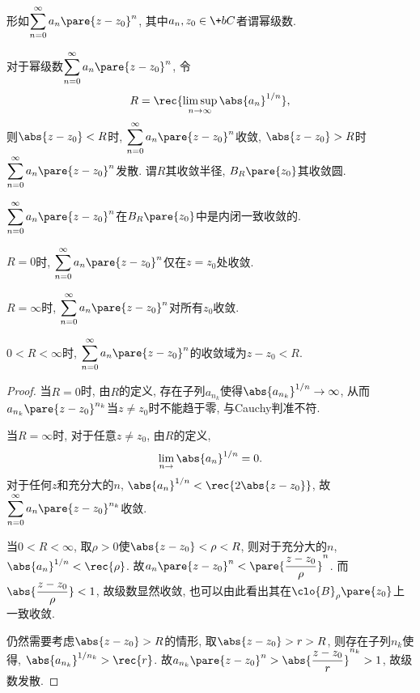 \documentclass{ctexart}
\begin{document}
\begin{definition}[幂级数]
    形如$\displaystyle \sum_{n=0}^\infty a_n\pare{z-z_0}^n$, 其中$a_n,z_0\in \+bC$者谓幂级数.
\end{definition}
\begin{theorem}[Abel判准]
    对于幂级数$\displaystyle \sum_{n=0}^\infty a_n\pare{z-z_0}^n$, 令
    \[ R = \rec{\limsup \limits_{n\rightarrow \infty} \abs{a_n}^{1/n}}, \]
    则$\abs{z-z_0}<R$时, $\displaystyle \sum_{n=0}^\infty a_n\pare{z-z_0}^n$收敛, $\abs{z-z_0}>R$时$\displaystyle \sum_{n=0}^\infty a_n\pare{z-z_0}^n$发散. 谓$R$其收敛半径, $B_R\pare{z_0}$其收敛圆.
\end{theorem}
\begin{remark}
    $\displaystyle \sum_{n=0}^\infty a_n\pare{z-z_0}^n$在$B_R\pare{z_0}$中是内闭一致收敛的.
\end{remark}
\begin{remark}
    $R=0$时, $\displaystyle \sum_{n=0}^\infty a_n\pare{z-z_0}^n$仅在$z=z_0$处收敛.
\end{remark}
\begin{remark}
    $R=\infty$时, $\displaystyle \sum_{n=0}^\infty a_n\pare{z-z_0}^n$对所有$z_0$收敛.
\end{remark}
\begin{remark}
    $0<R<\infty$时, $\displaystyle \sum_{n=0}^\infty a_n\pare{z-z_0}^n$的收敛域为${z-z_0}<R$.
\end{remark}
\begin{proof}
    当$R=0$时, 由$R$的定义, 存在子列$a_{n_k}$使得$\abs{a_{n_k}}^{1/n}\rightarrow\infty$, 从而$a_{n_k}\pare{z-z_0}^{n_k}$当$z\neq z_0$时不能趋于零, 与Cauchy判准不符.
    \par
    当$R=\infty$时, 对于任意$z\neq z_0$, 由$R$的定义,
    \[ \lim_{n\rightarrow} \abs{a_n}^{1/n} = 0. \]
    对于任何$z$和充分大的$n$, $\displaystyle\abs{a_n}^{1/n} < \rec{{2\abs{z-z_0}}}$, 故$\displaystyle \sum_{n=0}^\infty a_n\pare{z-z_0}^{n_k}$收敛.
    \par
    当$0<R<\infty$, 取$\rho>0$使$\abs{z-z_0}<\rho<R$, 则对于充分大的$n$, $\abs{a_n}^{1/n} < \displaystyle \rec{\rho}$. 故$a_n\pare{z-z_0}^n < \displaystyle \pare{\frac{z-z_0}{\rho}}^n$. 而$\displaystyle \abs{\frac{z-z_0}{\rho}}<1$, 故级数显然收敛, 也可以由此看出其在$\clo{B}_\rho\pare{z_0}$上一致收敛.
    \par
    仍然需要考虑$\abs{z-z_0}>R$的情形, 取$\abs{z-z_0}>r>R$, 则存在子列$n_k$使得, $\abs{a_{n_k}}^{1/n_k}>\displaystyle \rec{r}$. 故$a_{n_k}\pare{z-z_0}^n > \displaystyle\abs{\frac{z-z_0}{r}}^{n_k}>1$, 故级数发散.
\end{proof}
\end{document}
